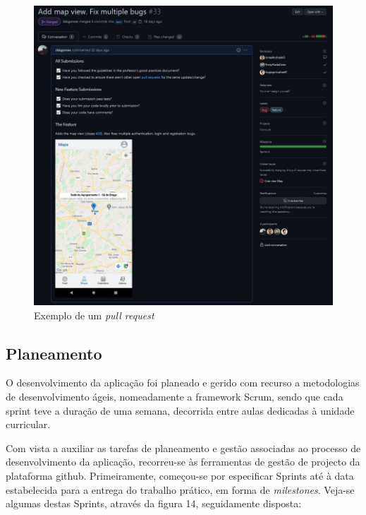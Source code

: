 \documentclass[12pt]{report}
\begin{document}
\bigskip
\begin{figure}[H]
    \centering
    \includegraphics[width=1\textwidth]{pull-request.png}
    \caption{Exemplo de um \textit{pull request}}
\end{figure}

\subsection{Planeamento}

O desenvolvimento da aplicação foi planeado e gerido com recurso a metodologias de desenvolvimento ágeis, nomeadamente a \gls{framework} Scrum, sendo que cada \gls{sprint} teve a duração de uma semana, decorrida entre aulas dedicadas à unidade curricular.

Com vista a auxiliar as tarefas de planeamento e gestão associadas ao processo de desenvolvimento da aplicação, recorreu-se às ferramentas de gestão de projecto da plataforma \gls{github}. Primeiramente, começou-se por especificar Sprints até à data estabelecida para a entrega do trabalho prático, em forma de \textit{milestones}. Veja-se algumas destas Sprints, através da figura 14, seguidamente disposta:
\end{document}
